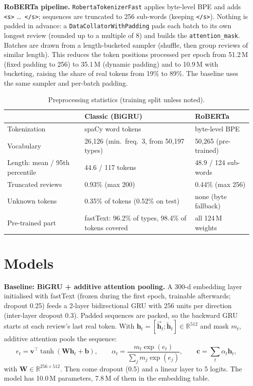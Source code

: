 \documentclass[11pt,a4paper]{article}
\begin{document}
\textbf{RoBERTa pipeline.} \texttt{RobertaTokenizerFast} applies byte-level BPE and adds \texttt{<s>} \dots\ \texttt{</s>}; sequences are truncated to 256 sub-words (keeping \texttt{</s>}). Nothing is padded in advance: a \texttt{DataCollatorWithPadding} pads each batch to its own longest review (rounded up to a multiple of 8) and builds the \texttt{attention\_mask}. Batches are drawn from a length-bucketed sampler (shuffle, then group reviews of similar length). This reduces the token positions processed per epoch from 51.2\,M (fixed padding to 256) to 35.1\,M (dynamic padding) and to 10.9\,M with bucketing, raising the share of real tokens from 19\% to 89\%. The baseline uses the same sampler and per-batch padding.

\begin{table}[htbp]
\centering\small
\caption{Preprocessing statistics (training split unless noted).}
\label{tab:prep}
\begin{tabular}{lll}
\toprule
 & \textbf{Classic (BiGRU)} & \textbf{RoBERTa} \\
\midrule
Tokenization & spaCy word tokens & byte-level BPE \\
Vocabulary & 26{,}126 (min.\ freq.\ 3, from 50{,}197 types) & 50{,}265 (pre-trained) \\
Length: mean / 95th percentile & 44.6 / 117 tokens & 48.9 / 124 sub-words \\
Truncated reviews & 0.93\% (max 200) & 0.44\% (max 256) \\
Unknown tokens & 0.35\% of tokens (0.52\% on test) & none (byte fallback) \\
Pre-trained part & fastText: 96.2\% of types, 98.4\% of tokens covered & all 124\,M weights \\
\bottomrule
\end{tabular}
\end{table}

\section{Models}
\textbf{Baseline: BiGRU + additive attention pooling.} A 300-d embedding layer initialised with fastText (frozen during the first epoch, trainable afterwards; dropout 0.25) feeds a 2-layer bidirectional GRU with 256 units per direction (inter-layer dropout 0.3). Padded sequences are packed, so the backward GRU starts at each review's last real token. With $\mathbf{h}_t=[\overrightarrow{\mathbf{h}}_t;\overleftarrow{\mathbf{h}}_t]\in\mathbb{R}^{512}$ and mask $m_t$, additive attention pools the sequence:
\begin{equation*}
e_t=\mathbf{v}^{\top}\tanh(\mathbf{W}\mathbf{h}_t+\mathbf{b}),\qquad
\alpha_t=\frac{m_t\exp(e_t)}{\sum_j m_j\exp(e_j)},\qquad
\mathbf{c}=\sum_t\alpha_t\mathbf{h}_t ,
\end{equation*}
with $\mathbf{W}\in\mathbb{R}^{256\times512}$. Then come dropout (0.5) and a linear layer to 5 logits. The model has 10.0\,M parameters, 7.8\,M of them in the embedding table.
\end{document}
